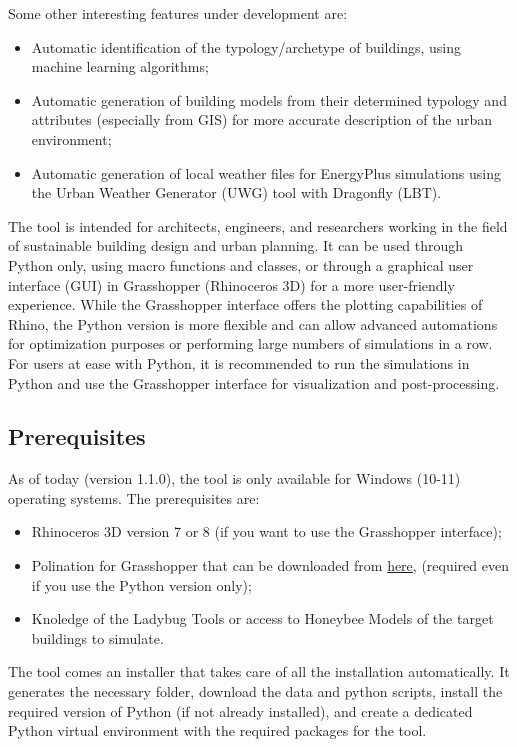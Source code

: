\documentclass[a4paper,12pt]{article} %
\begin{document}
    Some other interesting features under development are:
    \begin{itemize}
        \item Automatic identification of the typology/archetype of buildings, using machine learning algorithms;
        \item Automatic generation of building models from their determined typology and attributes (especially from GIS) for more accurate description of the urban environment;
        \item Automatic generation of local weather files for EnergyPlus simulations using the Urban Weather Generator (UWG) tool with Dragonfly (LBT).
    \end{itemize}
    \smallbreak
    The tool is intended for architects, engineers, and researchers working in the field of sustainable building design and urban planning.
    It can be used through Python only, using macro functions and classes, or through a graphical user interface (GUI) in Grasshopper (Rhinoceros 3D) for a more user-friendly experience.
    While the Grasshopper interface offers the plotting capabilities of Rhino, the Python version is more flexible and can allow advanced automations for optimization purposes or performing large numbers of simulations in a row.
    For users at ease with Python, it is recommended to run the simulations in Python and use the Grasshopper interface for visualization and post-processing.

    \subsection{Prerequisites}
    \label{subsec:prerequisites}
    As of today (version 1.1.0), the tool is only available for Windows (10-11) operating systems.
    The prerequisites are:
    \begin{itemize}
        \item Rhinoceros 3D version 7 or 8 (if you want to use the Grasshopper interface);
        \item Polination for Grasshopper that can be downloaded from \href{https://www.pollination.cloud/grasshopper-plugin}{here}, (required even if you use the Python version only);
        \item Knoledge of the Ladybug Tools or access to Honeybee Models of the target buildings to simulate.
    \end{itemize}
    The tool comes an installer that takes care of all the installation automatically.
    It generates the necessary folder, download the data and python scripts, install the required version of Python (if not already installed), and create a dedicated Python virtual environment with the required packages for the tool.
\end{document}
